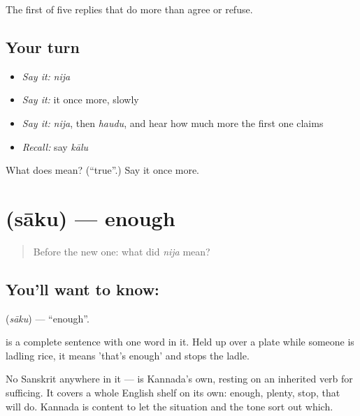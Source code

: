 \begin{grammarlens}[title={What you've built}]
The first of five replies that do more than agree or refuse.
\end{grammarlens}

\subsection*{Your turn}
\begin{itemize}
\raggedright
  \item \emph{Say it:} \emph{nija}
  \item \emph{Say it:} it once more, slowly
  \item \emph{Say it:} \emph{nija}, then \emph{haudu}, and hear how much more the first one claims
  \item \emph{Recall:} say \emph{kālu}
\end{itemize}

\begin{tcolorbox}[breakable,colback=teal!4,colframe=teal!35!black,title={Before you move on}]
What does  mean? (\textquotedblleft{}true\textquotedblright{}.) Say it once more.
\end{tcolorbox}
\section[\texorpdfstring{\kn{ಸಾಕು} (sāku)}{ಸಾಕು (sāku)}]{ (sāku) — enough}

\label{lesson:KA-C49-enough}



\begin{quote}
Before the new one: what did \emph{nija} mean?
\end{quote}

\subsection*{You'll want to know: }
\textbf{} (\emph{sāku}) — \textquotedblleft{}enough\textquotedblright{}.

 is a complete sentence with one word in it. Held up over a plate while someone is ladling rice, it means 'that's enough' and stops the ladle.

No Sanskrit anywhere in it —  is Kannada's own, resting on an inherited verb for sufficing. It covers a whole English shelf on its own: enough, plenty, stop, that will do. Kannada is content to let the situation and the tone sort out which.

